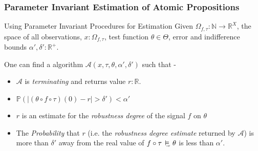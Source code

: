 \documentclass{beamer}
\newcommand{\typeReal}{\mathbb{R}}
\newcommand{\typeNat}{\mathbb{N}}
\newcommand{\typeProb}{\mathbb{P}}
\newcommand{\A}{\mathcal{A}}
\newcommand{\discrete}{\raisebox{-0.1ex}{\scalebox{0.25}{\textrm{DSC}}}}
\newcommand{\discreteSatisfy}{\ \stackMath\stackunder[0pt]{\vDash}{\hspace*{0.3em}\discrete}\ }
\begin{document}
\begin{frame}
\frametitle{Parameter Invariant Estimation of Atomic Propositions}

\begin{block}{Using Parameter Invariant Procedures for Estimation}
    Given $\Omega_{f, \tau}: \typeNat \to \typeReal^{X}$, the space
    of all observations, $x: \Omega_{f, \tau}$,  test function $\theta \in \Theta$,
    error and indifference bounds $\alpha', \delta' :\typeReal^{+}$.

    One can find a algorithm $\A(x, \tau, \theta, \alpha', \delta')$ such that -
    \begin{itemize}
        \item $\A$ is \textit{terminating} and returns value $r:\typeReal$.
        \item $\typeProb({\mid (\theta \circ f \circ \tau)(0) - r \mid > \delta'}) < \alpha'$
        \item $r$ is an estimate for the \textit{robustness degree} of the
            signal $f$ on $\theta$
        \item The \textit{Probability} that $r$ (i.e. the \textit{robustness degree estimate}
            returned by $\A$) is more than $\delta'$ away from the real value of
            $f \circ \tau \discreteSatisfy \theta$ is less than $\alpha'$.
    \end{itemize}

\end{block}
\end{frame}
\end{document}
